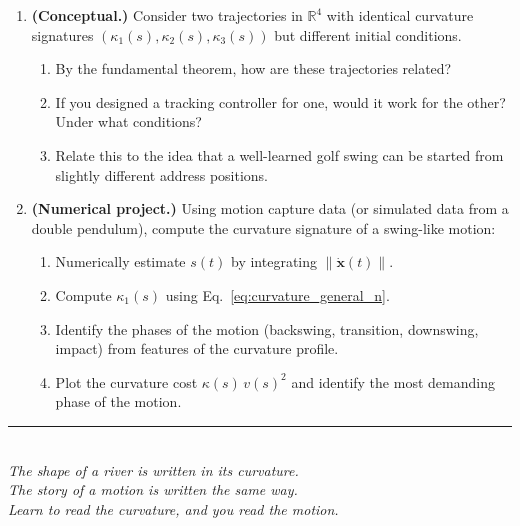 \documentclass[12pt, openany]{book}
\theoremstyle{plain}
\newcommand{\state}{\bm{x}}
\newcommand{\Reals}{\mathbb{R}}
\newcommand{\norm}[1]{\left\lVert #1 \right\rVert}
\begin{document}
\begin{enumerate}[label=\textbf{2.\arabic*.}, leftmargin=1.5cm]
\item \textbf{(Conceptual.)} Consider two trajectories in $\Reals^4$ with
  identical curvature signatures $(\kappa_1(s), \kappa_2(s), \kappa_3(s))$
  but different initial conditions.
  \begin{enumerate}[label=(\alph*)]
    \item By the fundamental theorem, how are these trajectories related?
    \item If you designed a tracking controller for one, would it work for the
      other? Under what conditions?
    \item Relate this to the idea that a well-learned golf swing can be started
      from slightly different address positions.
  \end{enumerate}

\item \textbf{(Numerical project.)} Using motion capture data (or simulated data
  from a double pendulum), compute the curvature signature of a swing-like motion:
  \begin{enumerate}[label=(\alph*)]
    \item Numerically estimate $s(t)$ by integrating $\norm{\dot{\state}(t)}$.
    \item Compute $\kappa_1(s)$ using Eq.~\eqref{eq:curvature_general_n}.
    \item Identify the phases of the motion (backswing, transition, downswing,
      impact) from features of the curvature profile.
    \item Plot the curvature cost $\kappa(s)\, v(s)^2$ and identify the most
      demanding phase of the motion.
  \end{enumerate}

\end{enumerate}

\vspace{1cm}
\begin{center}
  \rule{0.5\textwidth}{0.4pt}\\[0.5cm]
  {\small\itshape
  The shape of a river is written in its curvature.\\
  The story of a motion is written the same way.\\[0.3cm]
  Learn to read the curvature, and you read the motion.}
\end{center}
\end{document}
